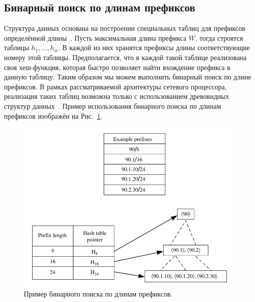 \documentclass[a4paper, 12pt, titlepage, finall]{extreport}
\begin{document}
        \subsection{Бинарный поиск по длинам префиксов}
            Структура данных основана на построении специальных таблиц для префиксов определённой длины~\cite{mun2006binary}. Пусть максимальная длина префикса {\ttfamily $W$}, 
            тогда строятся таблицы {\ttfamily $h_{1},\ldots,h_{w}$}. В каждой из них хранятся префиксы длины соответствующие номеру этой таблицы. Предполагается, 
            что в каждой такой таблице реализована своя хеш-функция, которая быстро позволяет найти вхождение префикса в данную таблицу.
            Таким образом мы можем выполнить бинарный поиск по длине префиксов. В рамках рассматриваемой архитектуры сетевого процессора, реализация таких таблиц возможна только
            с использованием древовидных структур данных~\cite{mun2006binary}. Пример использования бинарного поиска по длинам префиксов изображён на Рис.~\ref{fig:mesh4}.

            \begin{figure}[h]
                \centering
                \includegraphics[width=\textwidth]{binary_search.png}
                \caption{Пример бинарного поиска по длинам префиксов.}\label{fig:mesh4}
            \end{figure}
\end{document}
